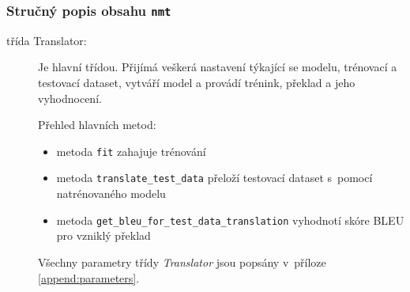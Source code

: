 

\subsubsection{Stručný popis obsahu \texttt{nmt}}
\begin{description}
  \item[třída Translator:] Je hlavní třídou. Přijímá veškerá nastavení týkající se modelu, trénovací a testovací dataset, vytváří model a provádí trénink, překlad a jeho vyhodnocení.

      Přehled hlavních metod:
      \begin{itemize}
                  \item metoda \texttt{fit} zahajuje trénování
                  \item metoda \texttt{translate\_test\_data} přeloží testovací dataset s~pomocí natrénovaného modelu
                  \item metoda \texttt{get\_bleu\_for\_test\_data\_translation} vyhodnotí skóre BLEU pro vzniklý překlad
      \end{itemize}

      Všechny parametry třídy \emph{Translator} jsou popsány v~příloze \ref{append:parameters}.


\end{description}
